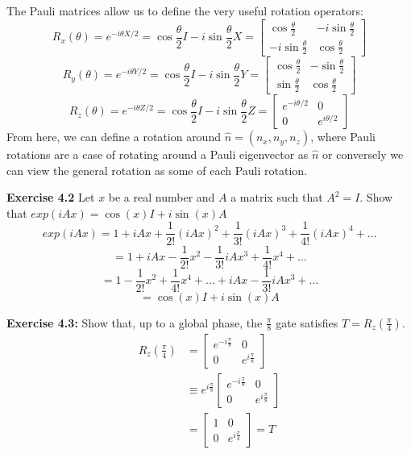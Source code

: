 \documentclass{article}
\begin{document}
\newpage
The Pauli matrices allow us to define the very useful rotation operators:
$$R_x(\theta) = e^{-i\theta X/2} = \cos \frac{\theta}{2}I -  i\sin \frac{\theta}{2}X = \begin{bmatrix} \cos \frac{\theta}{2} & -i \sin \frac{\theta}{2} \\ -i \sin \frac{\theta}{2} & \cos \frac{\theta}{2} \end{bmatrix}$$
$$R_y(\theta) = e^{-i\theta Y/2} = \cos \frac{\theta}{2}I -  i\sin \frac{\theta}{2}Y = \begin{bmatrix} \cos \frac{\theta}{2} & -\sin \frac{\theta}{2} \\ \sin \frac{\theta}{2} & \cos \frac{\theta}{2} \end{bmatrix}$$
$$R_z(\theta) = e^{-i\theta Z/2} = \cos \frac{\theta}{2}I -  i\sin \frac{\theta}{2}Z = \begin{bmatrix} e^{-i\theta/2} & 0 \\ 0 & e^{i\theta/2} \end{bmatrix}$$
From here, we can define a rotation around $\hat{n} = (n_x, n_y, n_z)$, where Pauli rotations are a case of rotating around a Pauli eigenvector as $\hat{n}$ or conversely we can view the general rotation as some of each Pauli rotation.
\begin{tcolorbox}\textbf{Exercise 4.2}
 Let $x$ be a real number and $A$ a matrix such that $A^2 = I$. Show that $exp(iAx) = \cos(x)I + i \sin(x)A$\\

	$$exp(iAx) = 1 + iAx  + \frac{1}{2!}(iAx)^2 + \frac{1}{3!}(iAx)^3 + \frac{1}{4!}(iAx)^4 + \dots$$
	$$=  1 + iAx - \frac{1}{2!}x^2 - \frac{1}{3!}iAx^3 + \frac{1}{4!}x^4+\dots$$
	$$= 1 - \frac{1}{2!}x^2 + \frac{1}{4!}x^4 + \dots + iAx - \frac{1}{3!}iAx^3 + \dots$$
	$$= \cos(x)I + i\sin(x)A$$
\end{tcolorbox}

\begin{tcolorbox}\textbf{Exercise 4.3:}
	Show that, up to a global phase, the $\frac{\pi}{8}$ gate satisfies $T = R_z(\frac{\pi}{4})$.\\

	\begin{align*}
		R_z(\frac{\pi}{4}) &= \begin{bmatrix}e^{-i\frac{\pi}{8}} & 0 \\ 0 & e^{i \frac{\pi}{8}}\end{bmatrix}\\
				  &\equiv e^{i\frac{\pi}{8}} \begin{bmatrix}e^{-i\frac{\pi}{8}} & 0 \\ 0 & e^{i \frac{\pi}{8}}\end{bmatrix}\\
				  &= \begin{bmatrix} 1 & 0 \\ 0 & e^{i \frac{\pi}{4}}\end{bmatrix} = T
\end{align*}
\end{tcolorbox}
\end{document}
